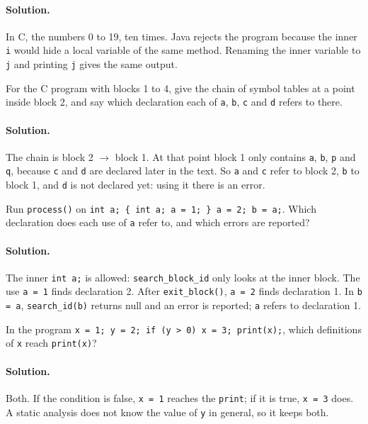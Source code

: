 \paragraph{Solution.} In C, the numbers 0 to 19, ten times. Java rejects the
program because the inner \texttt{i} would hide a local variable of the same
method. Renaming the inner variable to \texttt{j} and printing \texttt{j} gives
the same output.

\begin{exercise}
For the C program with blocks 1 to 4, give the chain of symbol tables at a
point inside block 2, and say which declaration each of \texttt{a}, \texttt{b},
\texttt{c} and \texttt{d} refers to there.
\end{exercise}

\paragraph{Solution.} The chain is block 2 $\to$ block 1. At that point block 1
only contains \texttt{a}, \texttt{b}, \texttt{p} and \texttt{q}, because
\texttt{c} and \texttt{d} are declared later in the text. So \texttt{a} and
\texttt{c} refer to block 2, \texttt{b} to block 1, and \texttt{d} is not
declared yet: using it there is an error.

\begin{exercise}
Run \texttt{process()} on \texttt{int a; \{ int a; a = 1; \} a = 2; b = a;}. Which
declaration does each use of \texttt{a} refer to, and which errors are
reported?
\end{exercise}

\paragraph{Solution.} The inner \texttt{int a;} is allowed: \texttt{search\_block\_id}
only looks at the inner block. The use \texttt{a = 1} finds declaration 2. After
\texttt{exit\_block()}, \texttt{a = 2} finds declaration 1. In \texttt{b = a},
\texttt{search\_id(b)} returns null and an error is reported; \texttt{a} refers to
declaration 1.

\begin{exercise}
In the program \texttt{x = 1; y = 2; if (y > 0) x = 3; print(x);}, which
definitions of \texttt{x} reach \texttt{print(x)}?
\end{exercise}

\paragraph{Solution.} Both. If the condition is false, \texttt{x = 1} reaches the
\texttt{print}; if it is true, \texttt{x = 3} does. A static analysis does not
know the value of \texttt{y} in general, so it keeps both.
